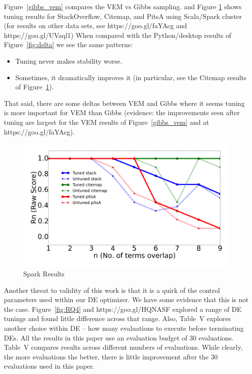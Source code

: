 \documentclass[10pt,conference]{IEEEtran}
\newcommand{\bi}{\begin{itemize}}
\newcommand{\ei}{\end{itemize}}
\theoremstyle{break}
\begin{document}
  Figure~\ref{gibbs_vem} compares the  VEM vs Gibbs sampling.
  and Figure
   \ref{python_spark} shows tuning results for StackOverflow, Citemap, and PitsA 
   using Scala/Spark cluster (for results on other data sets, see https://goo.gl/faYAcg
   and https://goo.gl/UVaql1)
   When compared with the Python/desktop results of
   Figure~\ref{fig:delta} we see the same patterns:
   \bi
 \item Tuning never makes stability worse.
 \item Sometimes, it dramatically improves it (in particular, see the Citemap results
   of  Figure~\ref{python_spark}).
   \ei
   That said, there are some deltas between VEM and Gibbs where it seems tuning
   is more important for VEM than Gibbs (evidence: the improvements seen after
   tuning are largest for the  VEM results of  Figure~\ref{gibbs_vem} and at  https://goo.gl/faYAcg).

   
\begin{figure}[!htbp]
  \captionsetup{justification=centering}
  \includegraphics[width=\linewidth]{./fig/spark.png}
  \caption{Spark Results}
  \label{python_spark}
\end{figure}


Another threat to validity of this work is that it is a quirk of the control
parameters used within our DE optimizer.
We have some evidence that this is not the case.
Figure~\ref{fig:RQ4} and https://goo.gl/HQNASF explored a range of DE tunings and found
little difference across that range. Also, Table~V explores another choice within DE -- how
many evaluations to execute before terminating DEs. All the results in this paper use an
evaluation budget of 30 evaluations. Table~V
compares results across different numbers of evaluations. While clearly,
the more evaluations the better, there is little improvement after the
30 evaluations used in this paper.
\end{document}

